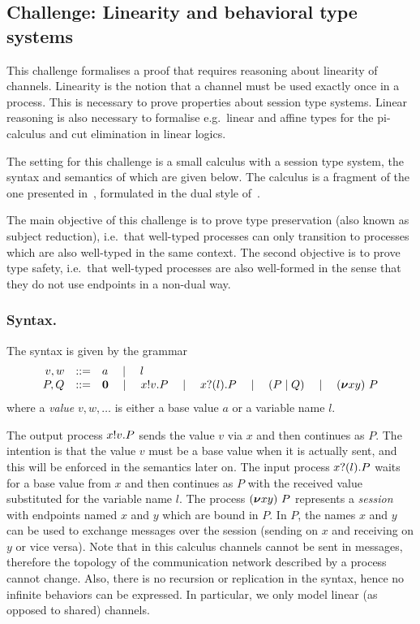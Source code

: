 \subsection{Challenge: Linearity and behavioral type systems}
\label{sec:challenge:linearity-beh-types}
This challenge formalises a proof that requires reasoning about linearity of channels.
Linearity is the notion that a channel must be used exactly once in a process.
This is necessary to prove properties about session type systems.
Linear reasoning is also necessary to formalise e.g.\ linear and affine types for the pi-calculus and cut elimination in linear logics.

The setting for this challenge is a small calculus with a session type
system, the syntax and semantics of which are given below. The
calculus is a fragment of the one presented in~\cite{Vasconcelos2012},
formulated in the dual style of~\cite{barber96tr}.

The main objective of this challenge is to prove type preservation (also
known as subject reduction), i.e.\ that well-typed
processes can only transition to processes which are also well-typed
in the same context.
The second objective is to prove type safety, i.e.\ that well-typed processes are also well-formed in the sense that they do not use endpoints in a non-dual way.

\subsubsection{Syntax.}
The syntax is given by the grammar
\[
\begin{array}{rcl}
  v,w & ::= & a \quad\mid\quad l \\
   P,Q & ::=& \bm{0} \quad\mid\quad x ! v . P \quad\mid\quad x ? (l) . P \quad\mid\quad (P \mid Q) \quad\mid\quad  (\bm{\nu} xy)~P
\end{array}
\]
where a \emph{value} \( v, w, \dots \) is either a base value \( a \) or a variable name \( l \).

The output process \( x ! v . P \) sends the value \( v \) via \( x \) and then continues as \( P \).
The intention is that the value \( v \) must be a base value when it is actually sent, and this will be enforced in the semantics later on.
The input process \( x ? (l) . P \) waits for a base value from \( x \) and then continues as \( P \) with the received value substituted for the variable name \( l \).
%
The process \( (\bm{\nu} xy)~P \) represents a \emph{session} with endpoints named \( x \) and \( y \) which are bound in \( P \). In \( P \), the names \( x \) and \( y \) can be used to exchange messages over the session (sending on \( x \) and receiving on \( y \) or vice versa).
%
%
Note that in this calculus channels cannot be sent in messages, therefore the topology of the communication network described by a process cannot change.
Also, there is no recursion or replication in the syntax, hence no infinite behaviors can be expressed. In particular, we only model linear (as opposed to shared) channels.

